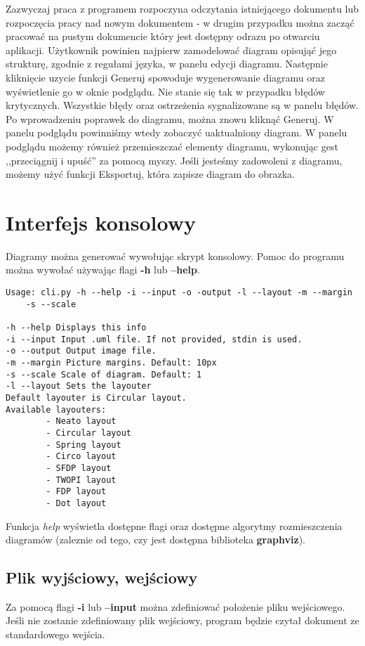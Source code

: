Zazwyczaj praca z programem rozpoczyna odczytania istniejącego dokumentu lub rozpoczęcia pracy nad nowym dokumentem - w drugim przypadku można zacząć pracować na pustym dokumencie który jest dostępny odrazu po otwarciu aplikacji. Użytkownik powinien najpierw zamodelować diagram opisująć jego strukturę, zgodnie z regułami języka, w panelu edycji diagramu. Następnie kliknięcie uzycie funkcji Generuj spowoduje wygenerowanie diagramu oraz wyświetlenie go w oknie podglądu. Nie stanie się tak w przypadku błędów krytycznych. Wszystkie błędy oraz ostrzeżenia sygnalizowane są w panelu błędów. Po wprowadzeniu poprawek do diagramu, można znowu kliknąć Generuj. W panelu podglądu powinniśmy wtedy zobaczyć uaktualniony diagram. W panelu podglądu możemy również przemieszczać elementy diagramu, wykonując gest ,,przeciągnij i upuść'' za pomocą myszy. Jeśli jesteśmy zadowoleni z diagramu, możemy użyć funkcji Eksportuj, która zapisze diagram do obrazka.

\section{Interfejs konsolowy}

Diagramy można generować wywołując skrypt konsolowy. Pomoc do programu można wywołać używając flagi \textbf{-h} lub \textbf{--help}.

\begin{lstlisting}
Usage: cli.py -h --help -i --input -o -output -l --layout -m --margin 
	-s --scale
	
-h --help Displays this info
-i --input Input .uml file. If not provided, stdin is used.
-o --output Output image file.
-m --margin Picture margins. Default: 10px
-s --scale Scale of diagram. Default: 1
-l --layout Sets the layouter
Default layouter is Circular layout.
Available layouters:
        - Neato layout
        - Circular layout
        - Spring layout
        - Circo layout
        - SFDP layout
        - TWOPI layout
        - FDP layout
        - Dot layout
\end{lstlisting}

Funkcja \emph{help} wyświetla dostępne flagi oraz dostępne algorytmy rozmieszczenia diagramów (zaleznie od tego, czy jest dostępna biblioteka \textbf{graphviz}).

\subsection{Plik wyjściowy, wejściowy}
Za pomocą flagi \textbf{-i} lub \textbf{--input} można zdefiniować położenie pliku wejściowego. Jeśli nie zostanie zdefiniowany plik wejściowy, program będzie czytał dokument ze standardowego wejścia.

